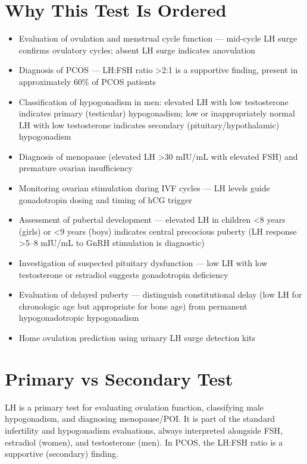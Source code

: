 \section*{Why This Test Is Ordered}
\begin{itemize}
  \item Evaluation of ovulation and menstrual cycle function --- mid-cycle LH surge confirms ovulatory cycles; absent LH surge indicates anovulation
  \item Diagnosis of PCOS --- LH:FSH ratio >2:1 is a supportive finding, present in approximately 60\% of PCOS patients \cite{balen2016management}
  \item Classification of hypogonadism in men: elevated LH with low testosterone indicates primary (testicular) hypogonadism; low or inappropriately normal LH with low testosterone indicates secondary (pituitary/hypothalamic) hypogonadism \cite{bhasin2018testosterone}
  \item Diagnosis of menopause (elevated LH >30 mIU/mL with elevated FSH) and premature ovarian insufficiency
  \item Monitoring ovarian stimulation during IVF cycles --- LH levels guide gonadotropin dosing and timing of hCG trigger
  \item Assessment of pubertal development --- elevated LH in children <8 years (girls) or <9 years (boys) indicates central precocious puberty (LH response >5--8 mIU/mL to GnRH stimulation is diagnostic)
  \item Investigation of suspected pituitary dysfunction --- low LH with low testosterone or estradiol suggests gonadotropin deficiency
  \item Evaluation of delayed puberty --- distinguish constitutional delay (low LH for chronologic age but appropriate for bone age) from permanent hypogonadotropic hypogonadism
  \item Home ovulation prediction using urinary LH surge detection kits
\end{itemize}

\section*{Primary vs Secondary Test}
LH is a primary test for evaluating ovulation function, classifying male hypogonadism, and diagnosing menopause/POI. It is part of the standard infertility and hypogonadism evaluations, always interpreted alongside FSH, estradiol (women), and testosterone (men). In PCOS, the LH:FSH ratio is a supportive (secondary) finding.

